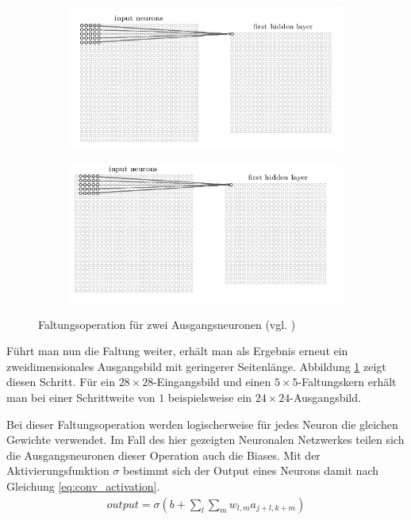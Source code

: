 \documentclass[../main.tex]{subfiles}
\begin{document}
\begin{figure}[!htbp]
	\centering
	\begin{subfigure}{0.5\textwidth}
		\centering
		\includegraphics[width=0.8\linewidth]{../images/Riedle/Convolution_2_1}
	\end{subfigure}%
	\begin{subfigure}{0.5\textwidth}
		\centering
		\includegraphics[width=0.8\linewidth]{../images/Riedle/Convolution_2_2}
	\end{subfigure}
	\caption{Faltungsoperation für zwei Ausgangsneuronen (vgl. \cite{NNADL_PIC_CONV_2})} \label{fig:conv_2}
\end{figure}
Führt man nun die Faltung weiter, erhält man als Ergebnis erneut ein zweidimensionales Ausgangsbild mit geringerer Seitenlänge. Abbildung \ref{fig:conv_2} zeigt diesen Schritt. Für ein $28\times28$-Eingangsbild und einen $5\times5$-Faltungskern erhält man bei einer Schrittweite von $1$ beispielsweise ein $24\times24$-Ausgangsbild. \par 
Bei dieser Faltungsoperation werden logischerweise für jedes Neuron die gleichen Gewichte verwendet. Im Fall des hier gezeigten Neuronalen Netzwerkes teilen sich die Ausgangsneuronen dieser Operation auch die Biases. Mit der Aktivierungsfunktion $\sigma$ bestimmt sich der Output eines Neurons damit nach Gleichung \ref{eq:conv_activation}.
\begin{align}\label{eq:con_activation}
	output = \sigma(b+ \sum\limits_l\sum\limits_m w_{l,m}a_{j+l,k+m})
\end{align} \par
\end{document}
